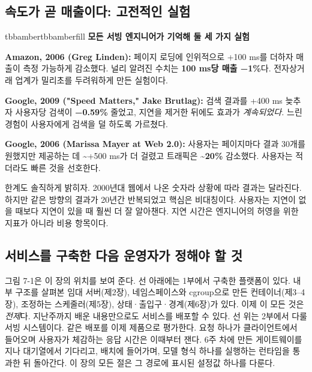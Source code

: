 \subsection*{속도가 곧 매출이다: 고전적인 실험}

\begin{calloutbox}{tbbamber}{tbbamberfill}
{\normalsize\bfseries\color{tbbamberdark}모든 서빙 엔지니어가 기억해 둘 세 가지 실험}\par\vspace{3pt}
\begin{tbbitemize}
  \item \textbf{Amazon, 2006 (Greg Linden):} 페이지 로딩에 인위적으로 +100 ms를 더하자 매출이 측정 가능하게 감소했다. 널리 알려진 수치는 \textbf{100 ms당 매출 −1\%}다. 전자상거래 업계가 밀리초를 두려워하게 만든 실험이다.
  \item \textbf{Google, 2009 ("Speed Matters," Jake Brutlag):} 검색 결과를 +400 ms 늦추자 사용자당 검색이 \textbf{−0.59\%} 줄었고, 지연을 제거한 뒤에도 효과가 \textit{계속되었다.} 느린 경험이 사용자에게 검색을 덜 하도록 가르쳤다.
  \item \textbf{Google, 2006 (Marissa Mayer at Web 2.0):} 사용자는 페이지마다 결과 30개를 원했지만 제공하는 데 \textasciitilde{}+500 ms가 더 걸렸고 트래픽은 \textbf{\textasciitilde{}20\%} 감소했다. 사용자는 적더라도 빠른 것을 선호한다.
\end{tbbitemize}

한계도 솔직하게 밝히자. 2000년대 웹에서 나온 숫자라 상황에 따라 결과는 달라진다. 하지만 같은 방향의 결과가 20년간 반복되었고 핵심은 비대칭이다. 사용자는 지연이 없을 때보다 지연이 있을 때 훨씬 더 잘 알아챈다. 지연 시간은 엔지니어의 허영을 위한 지표가 아니라 비용 항목이다.
\end{calloutbox}

\vspace{3.0pt}

\subsection*{서비스를 구축한 다음 운영자가 정해야 할 것}

그림 7-1은 이 장의 위치를 보여 준다. 선 아래에는 1부에서 구축한 플랫폼이 있다. 내부 구조를 살펴본 임대 서버(제2장), 네임스페이스와 cgroup으로 만든 컨테이너(제3–4장), 조정하는 스케줄러(제5장), 상태·출입구·경계(제6장)가 있다. 이제 이 모든 것은 \textit{전제}다. 지난주까지 배운 내용만으로도 서비스를 배포할 수 있다. 선 위는 2부에서 다룰 서빙 시스템이다. 같은 배포를 이제 제품으로 평가한다. 요청 하나가 클라이언트에서 들어오며 사용자가 체감하는 응답 시간은 이때부터 잰다. 6주 차에 만든 게이트웨이를 지나 대기열에서 기다리고, 배치에 들어가며, 모델 형식 하나를 실행하는 런타임을 통과한 뒤 돌아간다. 이 장의 모든 절은 그 경로에 표시된 설정값 하나를 다룬다.

